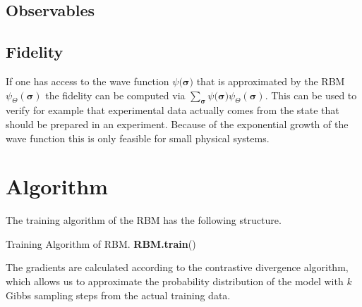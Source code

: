 \documentclass[a4paper]{article}
\begin{document}
\subsection{Observables}

\subsection{Fidelity}

If one has access to the wave function $\psi(\bm{\sigma)}$ that is approximated by the RBM $\psi_{\Theta}(\bm{\sigma})$ the fidelity can be computed via $\sum_{\bm{\sigma}} \psi(\bm{\sigma)} \psi_{\Theta}(\bm{\sigma})$. This can be used to verify for example that experimental data actually comes from the state that should be prepared in an experiment. Because of the exponential growth of the wave function this is only feasible for small physical systems.


\section{Algorithm}
The training algorithm of the RBM has the following structure.
 
\begin{algorithm}[H]
	 \caption{Training Algorithm of RBM. \textbf{RBM.train}() }
  \SetAlgoLined
 
\end{algorithm}


The gradients are calculated according to the contrastive divergence algorithm, which allows us to approximate the probability distribution of the model with $k$ Gibbs sampling steps from the actual training data.
\end{document}

